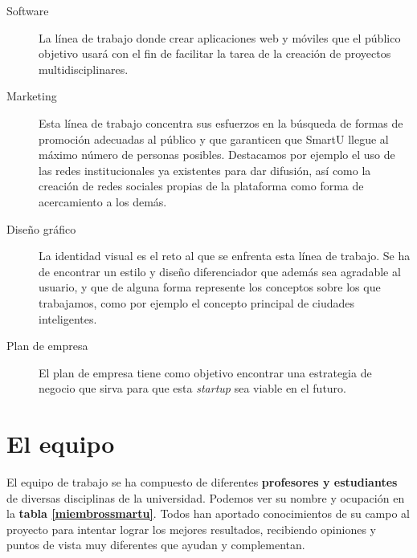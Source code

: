 \begin{description}
    \item[Software] La línea de trabajo donde crear aplicaciones web y móviles que el público objetivo usará con el fin de facilitar la tarea de la creación de proyectos multidisciplinares.
    \item[Marketing] Esta línea de trabajo concentra sus esfuerzos en la búsqueda de formas de promoción adecuadas al público y que garanticen que SmartU llegue al máximo número de personas posibles. Destacamos por ejemplo el uso de las redes institucionales ya existentes para dar difusión, así como la creación de redes sociales propias de la plataforma como forma de acercamiento a los demás.
    \item[Diseño gráfico] La identidad visual es el reto al que se enfrenta esta línea de trabajo. Se ha de encontrar un estilo y diseño diferenciador que además sea agradable al usuario, y que de alguna forma represente los conceptos sobre los que trabajamos, como por ejemplo el concepto principal de ciudades inteligentes.
    \item[Plan de empresa] El plan de empresa tiene como objetivo encontrar una estrategia de negocio que sirva para que esta \textit{startup} sea viable en el futuro.
\end{description}

\section{El equipo}
El equipo de trabajo se ha compuesto de diferentes \textbf{profesores y estudiantes} de diversas disciplinas de la universidad. Podemos ver su nombre y ocupación en la \textbf{tabla \ref{miembrossmartu}}. Todos han aportado conocimientos de su campo al proyecto para intentar lograr los mejores resultados, recibiendo opiniones y puntos de vista muy diferentes que ayudan y complementan.

